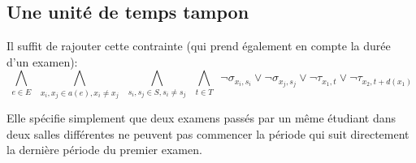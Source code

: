 \documentclass[a4paper]{article}
\begin{document}
\subsection{Une unité de temps tampon}
  Il suffit de rajouter cette contrainte (qui prend également en compte la durée d'un examen):
  $$  \bigwedge\limits_{e \in E} \,\,\,
      \bigwedge\limits_{x_i, x_j \in a(e), x_i \neq x_j} \,\,\,
      \bigwedge\limits_{s_i, s_j \in S, s_i \neq s_j} \,\,\,
      \bigwedge\limits_{t \in T} \,\,\,
      \lnot \sigma_{x_i, s_i} \lor \lnot \sigma_{x_j, s_j}
      \lor \lnot \tau_{x_1, t} \lor \lnot \tau_{x_2, t+d(x_1)} $$

  Elle spécifie simplement que deux examens passés par un même étudiant dans deux salles différentes ne peuvent pas commencer la période qui suit directement la dernière période du premier examen.
\end{document}
